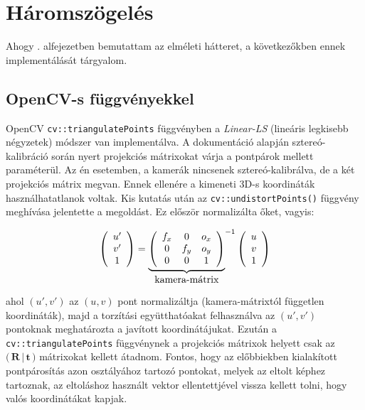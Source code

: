 \section{Háromszögelés}

Ahogy . alfejezetben bemutattam az elméleti hátteret, a következőkben ennek implementálását tárgyalom.

\subsection{OpenCV-s függvényekkel}

OpenCV \texttt{cv::triangulatePoints} függvényben a \textit{Linear-LS} (lineáris legkisebb négyzetek) módszer van implementálva. A dokumentáció \cite{camera-calib-3d} alapján sztereó-kalibráció során nyert projekciós mátrixokat várja a pontpárok mellett paraméterül. Az én esetemben, a kamerák nincsenek sztereó-kalibrálva, de a két projekciós mátrix megvan. Ennek ellenére a kimeneti 3D-s koordináták használhatatlanok voltak. Kis kutatás után az \texttt{cv::undistortPoints()} függvény meghívása jelentette a megoldást. Ez először normalizálta őket, vagyis:

\[\left(\begin{array}{c} u' \\ v' \\ 1 \end{array}\right) = {\underbrace{\left(\begin{array}{ccc}
f_x & 0 & o_x \\ 
0 & f_y & o_y \\
0 & 0 & 1
\end{array}\right)}_{\hbox{kamera-mátrix}}}^{-1} \left(\begin{array}{c} u \\ v \\ 1 \end{array}\right)\]

ahol $(u', v')$ az $(u, v)$ pont normalizáltja (kamera-mátrixtól független koordináták), majd a torzítási együtthatóakat felhasználva az $(u', v')$ pontoknak meghatározta a javított koordinátájukat. Ezután a \texttt{cv::triangulatePoints} függvénynek a projekciós mátrixok helyett csak az $\Big(\,\mathbf{R}\,|\,\mathbf{t}\,\Big)$ mátrixokat kellett átadnom. Fontos, hogy az előbbiekben kialakított pontpárosítás azon osztályához tartozó pontokat, melyek az eltolt képhez tartoznak, az eltoláshoz használt vektor ellentettjével vissza kellett tolni, hogy valós koordinátákat kapjak.

